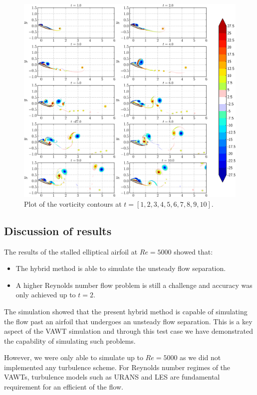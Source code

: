 	\begin{figure}[!p]
	\centering
	\includegraphics[width=\linewidth]{./figures/validation/ellipse/hybrid_ellipse_Hybrid_contours_compressed-crop.png}
	\caption{Plot of the vorticity contours at $t=[1,2,3,4,5,6,7,8,9,10]$.}
	\label{fig:hybrid_ellipse_Hybrid_contours}
	\end{figure}
	
\subsection{Discussion of results}	

The results of the stalled elliptical airfoil at $Re=5000$ showed that:
\begin{itemize}
\item The hybrid method is able to simulate the unsteady flow separation.
\item A higher Reynolds number flow problem is still a challenge and accuracy was only achieved up to $t=2$.
\end{itemize}

The simulation showed that the present hybrid method is capable of simulating the flow past an airfoil that undergoes an unsteady flow separation. This is a key aspect of the VAWT simulation and through this test case we have demonstrated the capability of simulating such problems.

However, we were only able to simulate up to $Re=5000$ as we did not implemented any turbulence scheme. For Reynolds number regimes of the VAWTs, turbulence models such as URANS and LES are fundamental requirement for an efficient of the flow.

